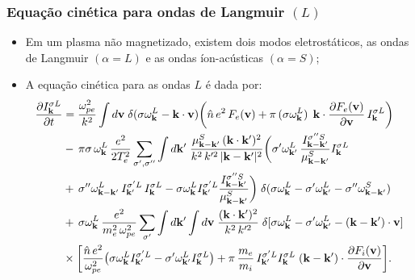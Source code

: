 \documentclass[10pt,aspectratio=1610,lualatex]{beamer}
\begin{document}
\begin{frame}
  \frametitle{Equação cinética para ondas de Langmuir $(L)$}
  \begin{itemize}
    \item Em um plasma não magnetizado, existem dois modos eletrostáticos,
    as ondas de Langmuir $(\alpha=L)$ e as ondas íon-acústicas $(\alpha=S)$;
    \pause
    \item A equação cinética para as ondas $L$ é dada por:
      \begin{equation}
	\label{L}
	\begin{split}
	  \frac{\partial I_{\bf k}^{\sigma L}}{\partial t}
	  &=\frac{\omega_{pe}^2}{k^2}\int d{\bf v}\;
	  \delta(\sigma\omega_{\bf k}^L-{\bf k}\cdot{\bf v})
	  \biggl(\hat{n}\,e^2\,F_e({\bf v})+\pi\,(\sigma\omega_{\bf k}^L)\,
	  \;{\bf k}\cdot\frac{\partial F_e({\bf v})}{\partial{\bf v}}
	  \,I_{\bf k}^{\sigma L}\biggr)\\
	  &-\,\pi\sigma\,\omega_{\bf k}^L\,
	  \frac{e^2}{2T_e^2}\sum_{\sigma ',\sigma ''}\int d{\bf k'}\;
	  \frac{\mu_{{\bf k}-{\bf k}'}^S \,({\bf k}\cdot{\bf k}')^2}
	  {k^2\,k'^2\,|{\bf k}-{\bf k}'|^2}\biggl(\sigma '\omega_{{\bf k}'}^L\,
	  \frac{I_{{\bf k}-{\bf k}'}^{\sigma ''S}}{\mu_{{\bf k}-{\bf k}'}^S}
	  I_{\bf k}^{\sigma L}\\
	  &+\,\sigma ''\omega_{{\bf k}-{\bf k}'}^L \,I_{{\bf k}'}^{\sigma 'L}\,
	  I_{\bf k}^{\sigma L}-\sigma\omega_{\bf k}^L I_{{\bf k}'}^{\sigma 'L}
	  \frac{I_{{\bf k}-{\bf k}'}^{\sigma ''S}}{\mu_{{\bf k}-{\bf k}'}^S}\biggr)\;
	  \delta(\sigma\omega_{\bf k}^L-\sigma '\omega_{{\bf k}'}^L
	  -\sigma ''\omega_{{\bf k}-{\bf k}'}^S)\\
	  &+\,\sigma\omega_{\bf k}^L\,\frac{e^2}{m_e^2\,\omega_{pe}^2}
	  \sum_{\sigma '}\int d{\bf k'}\int d{\bf v}\;
	  \frac{({\bf k}\cdot{\bf k}')^2}{k^2\,k'^2}\;
	  \delta[\sigma\omega_{\bf k}^L
	  -\sigma '\omega_{{\bf k}'}^L-({\bf k}-{\bf k}')\cdot{\bf v}]\\
	  &\times\biggl[\frac{\hat{n}\,e^2}{\omega_{pe}^2}
	  \bigl(\sigma\omega_{\bf k}^LI_{{\bf k}'}^{\sigma 'L} -\sigma
	  '\omega_{{\bf k}'}^L I_{\bf k}^{\sigma L}\bigr)
	  +\pi\,\frac{m_e}{m_i}\,I_{{\bf k}'}^{\sigma 'L} I_{\bf k}^{\sigma L}\;
	  ({\bf k}-{\bf k}')\cdot
	  \frac{\partial F_i({\bf v})}{\partial{\bf v}}\biggr].
	\end{split}
      \end{equation}
  \end{itemize}
\end{frame}
\end{document}
